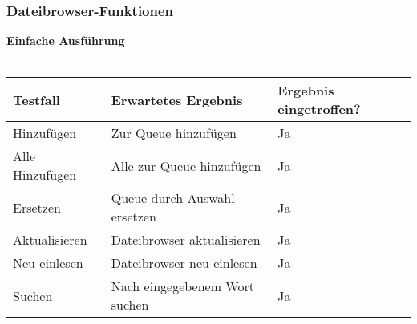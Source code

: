 \subsubsection{Dateibrowser-Funktionen}
\textbf{Einfache Ausführung}\ \\ \\
\begin{tabularx}{\textwidth}{|X|X|l|}
    \hline
    \textbf{Testfall} & \textbf{Erwartetes Ergebnis} & \textbf{Ergebnis eingetroffen?}\\
    \hline
    Hinzufügen & Zur Queue hinzufügen & Ja\\
    \hline
    Alle Hinzufügen & Alle zur Queue hinzufügen & Ja\\
    \hline
    Ersetzen & Queue durch Auswahl ersetzen & Ja\\
    \hline
    Aktualisieren & Dateibrowser aktualisieren & Ja\\
    \hline
    Neu einlesen & Dateibrowser neu einlesen & Ja\\
    \hline
    Suchen & Nach eingegebenem Wort suchen & Ja\\
    \hline
\end{tabularx}
\ \\ \\

